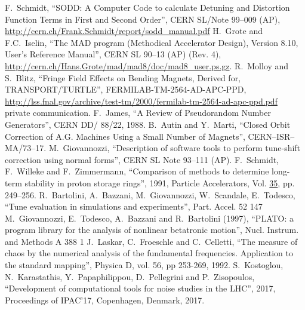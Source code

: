 \begin{thebibliography}{99}
        F.~Schmidt,
        ``SODD: A Computer Code to calculate Detuning and Distortion Function Terms in First and Second Order'',
        CERN SL/Note 99--009 (AP), \url{http://cern.ch/Frank.Schmidt/report/sodd\_manual.pdf}
        H.~Grote and F.C.~Iselin,
        ``The MAD program (Methodical Accelerator Design), Version 8.10, User's Reference Manual'',
        CERN SL 90--13 (AP) (Rev. 4), \url{http://cern.ch/Hans.Grote/mad/mad8/doc/mad8\_user.ps.gz}.
        R.~Molloy and S.~Blitz,
        ``Fringe Field Effects on Bending Magnets, Derived for, TRANSPORT/TURTLE'',
        FERMILAB-TM-2564-AD-APC-PPD, \url{http://lss.fnal.gov/archive/test-tm/2000/fermilab-tm-2564-ad-apc-ppd.pdf}
     private communication. %
        F.~James,
        ``A Review of Pseudorandom Number Generators'',
        CERN DD/ 88/22, 1988.
        B.~Autin and Y.~Marti,
        ``Closed Orbit Correction of A.G. Machines Using a Small Number of Magnets'',
        CERN--ISR--MA/73--17.
        M.~Giovannozzi,
        ``Description of software tools to perform tune-shift correction using normal forms'',
        CERN SL Note 93--111 (AP).
        F.~Schmidt, F.~Willeke and F.~Zimmermann,
        ``Comparison of methods to determine long-term stability in proton storage rings'',
        1991, Particle Accelerators, Vol. \underline{35}, pp. 249--256.
        R.~Bartolini, A.~Bazzani, M.~Giovannozzi, W.~Scandale, E.~Todesco,
        ``Tune evaluation in simulations and experiments'',
        Part. Accel. 52 147
        M.~Giovannozzi, E.~Todesco, A.~Bazzani and R.~Bartolini (1997),
        ``PLATO: a program library for the analysis of nonlinear betatronic motion'',
        Nucl. Instrum. and Methods A 388 1
        J.~Laskar, C.~Froeschle and C.~Celletti,
        ``The measure of chaos by the numerical analysis of the fundamental frequencies. Application to the standard mapping'',
        Physica D, vol. 56, pp 253-269, 1992.
        S.~Kostoglou, N.~Karastathis, Y.~Papaphilippou, D.~Pellegrini and P.~Zisopoulos,
        ``Development of computational tools for noise studies in the LHC'',
        2017, Proceedings of IPAC'17, Copenhagen, Denmark, 2017.

\end{thebibliography}
